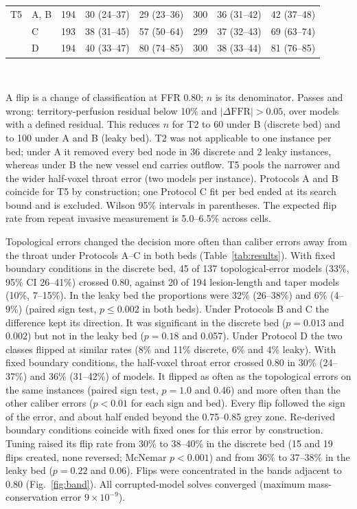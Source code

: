 \documentclass[journal,twoside,web]{ieeecolor}
\begin{document}
\begin{table}[!t]
\begin{tabular}{@{}llrccrcc@{}}
\addlinespace[2pt]
T5 & A, B & 194 & 30 (24--37) & 29 (23--36) & 300 & 36 (31--42) & 42 (37--48) \\
 & C & 193 & 38 (31--45) & 57 (50--64) & 299 & 37 (32--43) & 69 (63--74) \\
 & D & 194 & 40 (33--47) & 80 (74--85) & 300 & 38 (33--44) & 81 (76--85) \\
\bottomrule
\end{tabular}
\\[2pt]
\parbox{\textwidth}{\footnotesize A flip is a change of classification at FFR 0.80; $n$ is its denominator. Passes and wrong: territory-perfusion residual below 10\% and $|\Delta\mathrm{FFR}| > 0.05$, over models with a
defined residual. This reduces $n$ for T2 to 60 under B (discrete bed) and to 100 under A and B (leaky bed). T2 was not applicable to one instance per bed; under A it removed every bed node in 36 discrete and 2 leaky instances, whereas under B the new vessel end carries outflow. T5 pools the narrower and the wider half-voxel throat error (two models per instance). Protocols A and B coincide for T5 by construction; one Protocol C fit per bed ended at its search bound and is excluded. Wilson 95\% intervals in parentheses. The expected flip
rate from repeat invasive measurement is 5.0--6.5\% across cells.}
\end{table}

Topological errors changed the decision more often than caliber errors away from the throat under Protocols A--C in both beds
(Table~\ref{tab:results}). With fixed boundary conditions in the discrete bed, 45 of 137 topological-error models
(33\%, 95\% CI 26--41\%) crossed 0.80, against 20 of 194 lesion-length and taper models (10\%, 7--15\%). In the leaky bed the
proportions were 32\% (26--38\%) and 6\% (4--9\%) (paired sign test, $p \leq 0.002$ in both beds). Under
Protocols B and C the difference kept its direction. It was significant in the discrete bed
($p = 0.013$ and 0.002) but not in the leaky bed ($p = 0.18$ and 0.057). Under Protocol D the two classes
flipped at similar rates (8\% and 11\% discrete, 6\% and 4\% leaky). With fixed boundary conditions, the half-voxel throat error crossed 0.80 in 30\% (24--37\%) and 36\% (31--42\%) of models. It flipped as often as the topological errors on the same instances (paired sign test, $p = 1.0$ and 0.46) and more often than the other caliber errors ($p < 0.01$ for each sign and bed). Every flip followed the sign of the error, and about half ended beyond the 0.75--0.85 grey zone. Re-derived boundary conditions coincide with fixed ones for this error by construction. Tuning raised its flip rate from 30\% to 38--40\% in the discrete bed (15 and 19 flips created, none reversed; McNemar $p < 0.001$) and from 36\% to 37--38\% in the leaky bed ($p = 0.22$ and 0.06). Flips were concentrated in the bands adjacent to 0.80 (Fig.~\ref{fig:band}). All corrupted-model solves converged (maximum mass-conservation error $9\times10^{-9}$).
\end{document}
